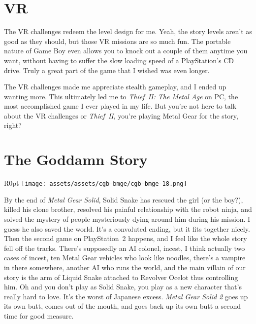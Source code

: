 \documentclass{book}
\let\oldcenter\center
\let\oldendcenter\endcenter
\renewenvironment{center}{\setlength\topsep{0pt}\oldcenter}{\oldendcenter}
\begin{document}
\FloatBarrier\needspace{10mm}\section*{VR}\nopagebreak[4]

The VR challenges redeem the level design for me. Yeah, the story levels aren’t as good as they should, but those VR missions are so much fun. The portable nature of Game Boy even allows you to knock out a couple of them anytime you want, without having to suffer the slow loading speed of a PlayStation’s CD drive. Truly a great part of the game that I wished was even longer.

\begin{center}
\quad\vspace{4pt}
\quad\vspace{4pt}
\quad\vspace{4pt}
\end{center}

The VR challenges made me appreciate stealth gameplay, and I ended up wanting more. This ultimately led me to \emph{Thief~II: The Metal Age} on PC, the most accomplished game I ever played in my life. But you’re not here to talk about the VR challenges or \emph{Thief~II}, you’re playing Metal Gear for the story, right?

\FloatBarrier\needspace{10mm}\section*{The Goddamn Story}\nopagebreak[4]

\begin{wrapfigure}{R}{0pt} \texttt{[image: assets/assets/cgb-bmge/cgb-bmge-18.png]}\end{wrapfigure}
By the end of \emph{Metal Gear Solid}, Solid Snake has rescued the girl (or the boy?), killed his clone brother, resolved his painful relationship with the robot ninja, and solved the mystery of people mysteriously dying around him during his mission. I guess he also saved the world. It’s a convoluted ending, but it fits together nicely. Then the second game on PlayStation~2 happens, and I feel like the whole story fell off the tracks. There’s supposedly an AI colonel, incest, I think actually two cases of incest, ten Metal Gear vehicles who look like noodles, there’s a vampire in there somewhere, another AI who runs the world, and the main villain of our story is the arm of Liquid Snake attached to Revolver Ocelot thus controlling him. Oh and you don’t play as Solid Snake, you play as a new character that’s really hard to love. It’s the worst of Japanese excess. \emph{Metal Gear Solid 2} goes up its own butt, comes out of the mouth, and goes back up its own butt a second time for good measure.
\end{document}
